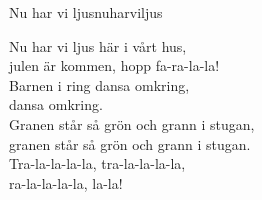 \begin{song}{Nu har vi ljus}{nuharviljus}
\begin{vers}
Nu har vi ljus här i vårt hus,\\
julen är kommen, hopp fa-ra-la-la!\\
Barnen i ring dansa omkring,\\
dansa omkring.\\
Granen står så grön och grann i stugan,\\
granen står så grön och grann i stugan.\\
Tra-la-la-la-la, tra-la-la-la-la,\\
ra-la-la-la-la, la-la!\\
\end{vers}
\end{song}
